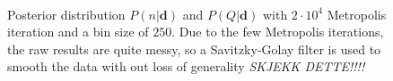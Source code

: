 \documentclass{emulateapj}
\begin{document}
\begin{figure}[t!]
\centering
{}\\
\caption{Posterior distribution $P(n|\mathbf{d})$ and $P(Q|\mathbf{d})$ with $2\cdot 10^4$ Metropolis iteration and a bin size of $250$. Due to the few Metropolis iterations, the raw results are quite messy, so a Savitzky-Golay filter is used to smooth the data with out loss of generality \emph{SKJEKK DETTE!!!!}}
\label{fig:QnDist}
\end{figure}
\end{document}
